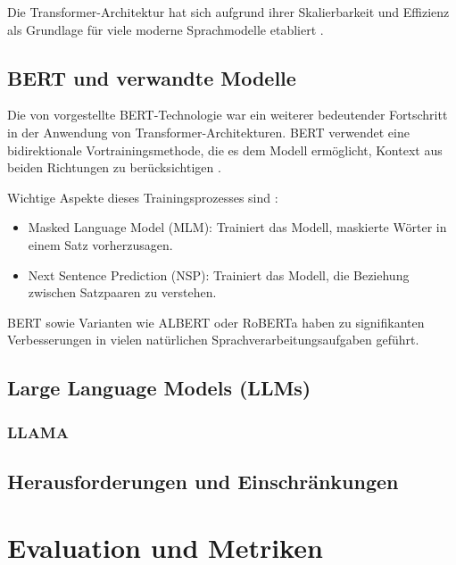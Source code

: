 Die Transformer-Architektur hat sich aufgrund ihrer Skalierbarkeit und Effizienz als Grundlage für viele moderne Sprachmodelle etabliert \cite{VaswaniAshish2023AIAY}.

\subsection{BERT und verwandte Modelle}
\label{subsec:bert}

Die von \textcite{DevlinJacob2019BPoD} vorgestellte \gls{BERT}-Technologie war ein weiterer bedeutender Fortschritt in der Anwendung von Transformer-Architekturen. BERT verwendet eine bidirektionale Vortrainingsmethode, die es dem Modell ermöglicht, Kontext aus beiden Richtungen zu berücksichtigen \cite{DevlinJacob2019BPoD}.

Wichtige Aspekte dieses Trainingsprozesses sind \cite{DevlinJacob2019BPoD}:
\begin{itemize}
	\item Masked Language Model (MLM): Trainiert das Modell, maskierte Wörter in einem Satz vorherzusagen.
	\item Next Sentence Prediction (NSP): Trainiert das Modell, die Beziehung zwischen Satzpaaren zu verstehen.
\end{itemize}
 \gls{BERT}\cite{DevlinJacob2019BPoD} sowie Varianten wie ALBERT\cite{LanZhenzhong2019AALB} oder RoBERTa\cite{liu2019robertarobustlyoptimizedbert} haben zu signifikanten Verbesserungen in vielen natürlichen Sprachverarbeitungsaufgaben geführt.

\subsection{Large Language Models (LLMs)}
\label{subsec:llms}

\subsubsection{LLAMA}
\label{subsubsec:LLAMA}

\subsection{Herausforderungen und Einschränkungen}
\label{subsec:llm-challenges}

\section{Evaluation und Metriken}
\label{sec:evaluation-metrics}

